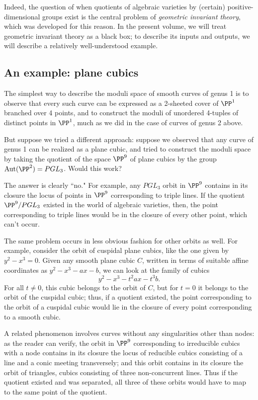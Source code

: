 Indeed, the question of when quotients of algebraic varieties by (certain) positive-dimensional groups exist is the central problem of \emph{geometric invariant theory}, which was developed for this reason. In the present volume, we will treat geometric invariant theory as a black box; to describe its inputs and outputs, we will describe a relatively well-understood example.

\subsection{An example: plane cubics}

The simplest way to describe the moduli space of smooth curves of genus 1 is to observe that every such curve can be expressed as a 2-sheeted cover of $\PP^1$ branched over 4 points, and to construct the moduli of unordered 4-tuples of distinct points in $\PP^1$, much as we did in the case of curves of genus 2 above.

But suppose we tried a different approach: suppose we observed that any curve of genus 1 can be realized as a plane cubic, and tried to construct the moduli space by taking the quotient of the space $\PP^9$ of plane cubics by the group ${\rm Aut}(\PP^2) = PGL_3$. Would this work?

The answer is clearly ``no." For example, any $PGL_3$ orbit in $\PP^9$ contains in its closure the locus of points in $\PP^9$ corresponding to triple lines. If the quotient $\PP^9/PGL_3$ existed in the world of algebraic varieties, then, the point corresponding to triple lines would be in the closure of every other point, which can't occur. 

The same problem occurs in less obvious fashion for other orbits as well. For example, consider the orbit of cuspidal plane cubics, like the one given by $y^2-x^3=0$. Given any smooth plane cubic $C$, written in terms of suitable affine coordinates as $y^2-x^3 - ax - b$, we can look at the family of cubics
$$
y^2 - x^3 - t^2ax - t^3b.
$$
For all $t \neq 0$, this cubic belongs to the orbit of $C$, but for $t=0$ it belongs to the orbit of the cuspidal cubic; thus, if a quotient existed, the point corresponding to the orbit of a cuspidal cubic would lie in the closure of every point corresponding to a smooth cubic. 

A related phenomenon involves curves without any singularities other than nodes: as the reader can verify, the orbit in $\PP^9$ corresponding to irreducible cubics with a node contains in its closure the locus of reducible cubics consisting of a line and a conic meeting transversely; and this orbit contains in its closure the orbit of triangles, cubics consisting of three non-concurrent lines. Thus if the quotient existed and was separated, all three of these orbits would have to map to the same point of the quotient.

